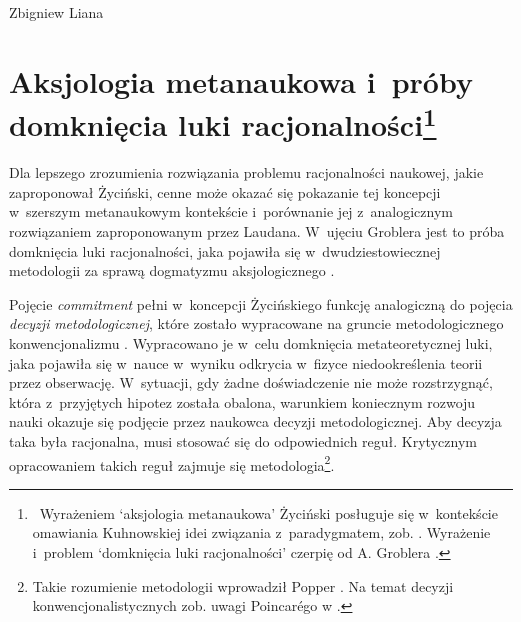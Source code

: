 \begin{artplenv}{Zbigniew Liana}
\section[Aksjologia metanaukowa i~próby domknięcia luki racjonalności]{Aksjologia metanaukowa i~próby domknięcia luki racjonalności\footnote{\ Wyrażeniem ‘aksjologia metanaukowa' Życiński posługuje się w~kontekście omawiania Kuhnowskiej idei związania z~paradygmatem, zob.
\parencite[][s.~161]{zycinski_teizm_1985}. %
 Wyrażenie i~problem ‘domknięcia luki racjonalności' czerpię od A. Groblera 
\parencite*[][s.~11–22]{grobler_prawda_1993}.%
}}
Dla lepszego zrozumienia rozwiązania problemu racjonalności naukowej, jakie zaproponował Życiński, cenne może okazać się pokazanie tej koncepcji w~szerszym metanaukowym kontekście i~porównanie jej z~analogicznym rozwiązaniem zaproponowanym przez Laudana. W~ujęciu Groblera jest to próba domknięcia luki racjonalności, jaka pojawiła się w~dwudziestowiecznej metodologii za sprawą dogmatyzmu aksjologicznego
\parencite[][s.~12nn]{grobler_prawda_1993}.%


Pojęcie \textit{commitment} pełni w~koncepcji Życińskiego funkcję analogiczną do pojęcia \textit{decyzji} \textit{metodologicznej}, które zostało wypracowane na gruncie metodologicznego konwencjonalizmu
\parencite[por.][s.~157.159n]{zycinski_teizm_1985}. %
 Wypracowano je w~celu domknięcia metateoretycznej luki, jaka pojawiła się w~nauce w~wyniku odkrycia w~fizyce niedookreślenia teorii przez obserwację. W~sytuacji, gdy żadne doświadczenie nie może rozstrzygnąć, która z~przyjętych hipotez została obalona, warunkiem koniecznym rozwoju nauki okazuje się podjęcie przez naukowca decyzji metodologicznej. Aby decyzja taka była racjonalna, musi stosować się do odpowiednich reguł. Krytycznym opracowaniem takich reguł zajmuje się metodologia\footnote{Takie rozumienie metodologii wprowadził Popper 
\parencite[zob. np.][s.~5.111]{popper_beiden_1979}. %
 Na temat decyzji konwencjonalistycznych zob. uwagi Poincarégo w
\parencite[][s.~261–269]{szumilewicz-lachman_poincare_1978}.%
}.


\end{artplenv}
